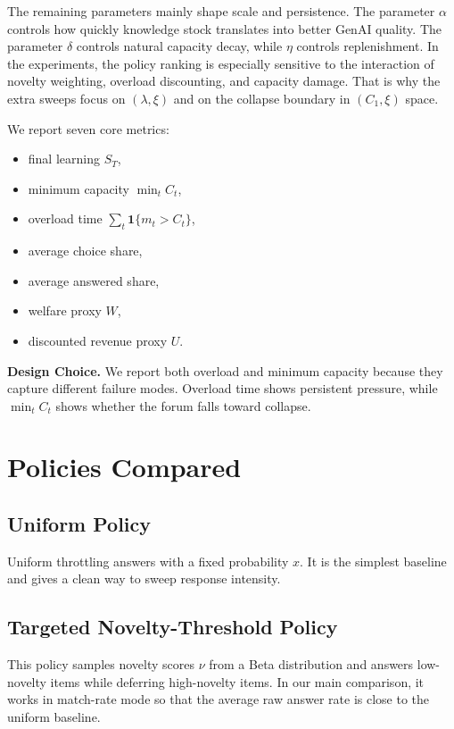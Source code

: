 \documentclass{article}
\newenvironment{designchoice}
  {\begin{framed}\noindent\textbf{Design Choice. }}
  {\end{framed}}
\begin{document}
The remaining parameters mainly shape scale and persistence. The parameter $\alpha$ controls how quickly knowledge stock translates into better GenAI quality. The parameter $\delta$ controls natural capacity decay, while $\eta$ controls replenishment. In the experiments, the policy ranking is especially sensitive to the interaction of novelty weighting, overload discounting, and capacity damage. That is why the extra sweeps focus on $(\lambda,\xi)$ and on the collapse boundary in $(C_1,\xi)$ space.

We report seven core metrics:
\begin{itemize}[leftmargin=1.5em]
\item final learning $S_T$,
\item minimum capacity $\min_t C_t$,
\item overload time $\sum_t \mathbf{1}\{m_t > C_t\}$,
\item average choice share,
\item average answered share,
\item welfare proxy $W$,
\item discounted revenue proxy $U$.
\end{itemize}

\begin{designchoice}
We report both overload and minimum capacity because they capture different failure modes. Overload time shows persistent pressure, while $\min_t C_t$ shows whether the forum falls toward collapse.
\end{designchoice}

\section{Policies Compared}
\subsection{Uniform Policy}
Uniform throttling answers with a fixed probability $x$. It is the simplest baseline and gives a clean way to sweep response intensity.

\subsection{Targeted Novelty-Threshold Policy}
This policy samples novelty scores $\nu$ from a Beta distribution and answers low-novelty items while deferring high-novelty items. In our main comparison, it works in match-rate mode so that the average raw answer rate is close to the uniform baseline.
\end{document}
